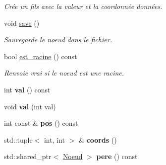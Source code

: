 \begin{DoxyCompactItemize}
\begin{DoxyCompactList}\small\item\em Crée un fils avec la valeur et la coordonnée données. \end{DoxyCompactList}\item 
void \hyperlink{classMemArbre_1_1Noeud_a710f476869b71d13a8e26eddd86a08f9}{save} ()\hypertarget{classMemArbre_1_1Noeud_a710f476869b71d13a8e26eddd86a08f9}{}\label{classMemArbre_1_1Noeud_a710f476869b71d13a8e26eddd86a08f9}

\begin{DoxyCompactList}\small\item\em Sauvegarde le noeud dans le fichier. \end{DoxyCompactList}\item 
bool \hyperlink{classMemArbre_1_1Noeud_abb962cfea5c62f59b00ba4d89be3bee9}{est\+\_\+racine} () const \hypertarget{classMemArbre_1_1Noeud_abb962cfea5c62f59b00ba4d89be3bee9}{}\label{classMemArbre_1_1Noeud_abb962cfea5c62f59b00ba4d89be3bee9}

\begin{DoxyCompactList}\small\item\em Renvoie vrai si le noeud est une racine. \end{DoxyCompactList}\item 
int {\bfseries val} () const \hypertarget{classMemArbre_1_1Noeud_a6a4ea4e942bf9386355fbc07b9b20a58}{}\label{classMemArbre_1_1Noeud_a6a4ea4e942bf9386355fbc07b9b20a58}

\item 
void {\bfseries val} (int val)\hypertarget{classMemArbre_1_1Noeud_a1a0284e4bbece82e6ba90147daf15fbb}{}\label{classMemArbre_1_1Noeud_a1a0284e4bbece82e6ba90147daf15fbb}

\item 
int const \& {\bfseries pos} () const \hypertarget{classMemArbre_1_1Noeud_a80908f07b60962b3ad38a5bcdd3e739f}{}\label{classMemArbre_1_1Noeud_a80908f07b60962b3ad38a5bcdd3e739f}

\item 
std\+::tuple$<$ int, int $>$ \& {\bfseries coords} ()\hypertarget{classMemArbre_1_1Noeud_a97ffd0d907bf6d61fc19446212c676de}{}\label{classMemArbre_1_1Noeud_a97ffd0d907bf6d61fc19446212c676de}

\item 
std\+::shared\+\_\+ptr$<$ \hyperlink{classMemArbre_1_1Noeud}{Noeud} $>$ {\bfseries pere} () const \hypertarget{classMemArbre_1_1Noeud_ade2357880c5929f836edc962301edf25}{}\label{classMemArbre_1_1Noeud_ade2357880c5929f836edc962301edf25}


\end{DoxyCompactItemize}
